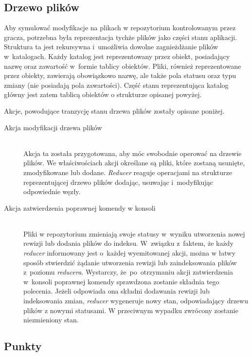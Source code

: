 \documentclass[12pt,a4paper,polish,thesis]{dcsbook}
\begin{document}
{	\subsection{Drzewo plików} \label{DrzewoStan}
	
	Aby symulować modyfikacje na plikach w repozytorium kontrolowanym przez gracza, potrzebna była reprezentacja tychże plików jako części stanu aplikacji. Struktura ta jest rekursywna i~umożliwia dowolne zagnieżdżanie plików w~katalogach. Każdy katalog jest reprezentowany przez obiekt, posiadający nazwę oraz zawartość w~formie tablicy obiektów. Pliki, również reprezentowane przez obiekty, zawierają obowiązkowo nazwę, ale także pola statusu oraz typu zmiany (nie posiadają pola zawartości). Część stanu reprezentująca katalog główny jest zatem tablicą obiektów o strukturze opisanej powyżej.
	
	Akcje, powodujące tranzycję stanu drzewa plików zostały opisane poniżej.
	
	\begin{description}
	\item[Akcja modyfikacji drzewa plików] \hfill \\
	Akcja ta została przygotowana, aby móc swobodnie operować na drzewie plików. We właściwościach akcji określane są pliki, które zostaną usunięte, zmodyfikowane lub dodane. \textit{Reducer} reaguje operacjami na strukturze reprezentującej drzewo plików dodając, usuwając i~modyfikując odpowiednie węzły.
	
	\item[Akcja zatwierdzenia poprawnej komendy w konsoli] \hfill \\
	Pliki w repozytorium zmieniają swoje statusy w~wyniku utworzenia nowej rewizji lub dodania plików do indeksu. W~związku z~faktem, że każdy \textit{reducer} informowany jest o~każdej wyemitowanej akcji, można w łatwy sposób stwierdzić żądanie utworzenia rewizji lub zaindeksowania plików z~poziomu \textit{reducera}. Wystarczy, że~po~otrzymaniu akcji zatwierdzenia w~konsoli poprawnej komendy sprawdzona zostanie składnia tego polecenia. Jeżeli odpowiada ona składni dodawania rewizji lub indeksowania zmian, \textit{reducer} wygeneruje nowy stan, odpowiadający drzewu plików z nowymi statusami. W przeciwnym wypadku zwrócony zostanie niezmieniony stan.
	\end{description}
	
	\subsection{Punkty}
	
}
\end{document}
